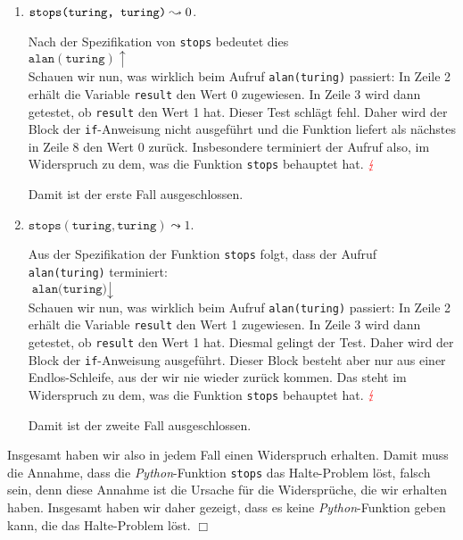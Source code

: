 \begin{enumerate}
\item $\texttt{stops(\texttt{turing}, \texttt{turing})} \leadsto 0$. 

      Nach der Spezifikation von \texttt{stops} bedeutet dies \\[0.1cm]
      \hspace*{1.3cm} $\texttt{alan}(\texttt{turing}) \uparrow$ \\[0.1cm]
      Schauen wir nun, was wirklich beim Aufruf \texttt{alan(turing)} passiert:
      In Zeile 2 erhält die Variable \texttt{result} den Wert 0 zugewiesen.  In Zeile 3
      wird dann getestet, ob \texttt{result} den Wert 1 hat.  Dieser Test schlägt fehl.
      Daher wird der Block der \texttt{if}-Anweisung nicht ausgeführt und die Funktion liefert als
      nächstes in Zeile 8 den Wert 0 zurück.  Insbesondere terminiert der Aufruf also, im
      Widerspruch zu dem, was die Funktion \texttt{stops} behauptet hat. ${\color{red}\lightning}$

      Damit ist der erste Fall ausgeschlossen.
\item  $\mathtt{stops}(\texttt{turing}, \texttt{turing}) \leadsto 1$. 

      Aus der Spezifikation der Funktion \texttt{stops} folgt, dass der Aufruf
      \texttt{alan(turing)} terminiert: \\[0.1cm]
      \hspace*{1.3cm} $\texttt{alan(turing)} \downarrow$ \\[0.1cm]
      Schauen wir nun, was wirklich beim Aufruf \texttt{alan(turing)} passiert:
      In Zeile 2 erhält die Variable \texttt{result} den Wert 1 zugewiesen.  In Zeile 3
      wird dann getestet, ob \texttt{result} den Wert 1 hat.  Diesmal gelingt der Test.
      Daher wird der Block der \texttt{if}-Anweisung ausgeführt.  Dieser Block
      besteht aber nur aus einer Endlos-Schleife, aus der wir nie wieder zurück kommen.
      Das steht im Widerspruch zu dem, was die Funktion \texttt{stops} behauptet hat.
      ${\color{red}\lightning}$

      Damit ist der zweite Fall ausgeschlossen.
\end{enumerate}
Insgesamt haben wir also in jedem Fall einen Widerspruch erhalten.  
Damit muss die Annahme, dass die \textsl{Python}-Funktion \texttt{stops}
das Halte-Problem löst, falsch sein, denn diese Annahme ist die Ursache für die Widersprüche, die
wir erhalten haben.  Insgesamt haben wir daher gezeigt, dass es keine \textsl{Python}-Funktion
geben kann, die das Halte-Problem löst. \hspace*{\fill} $\Box$
\vspace*{0.3cm}

